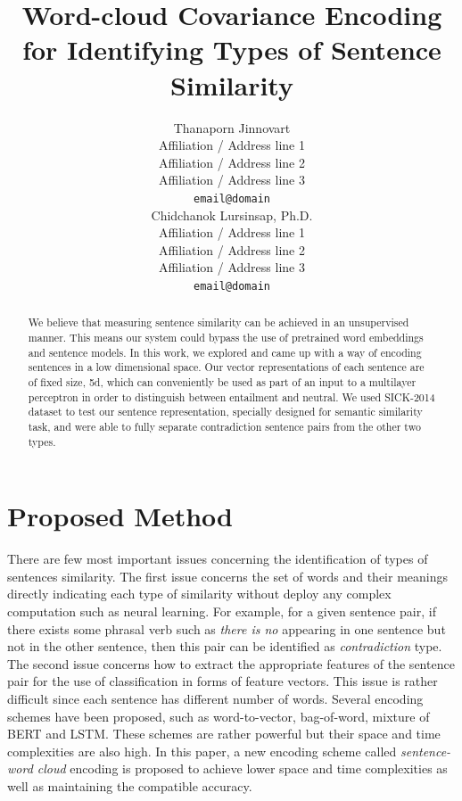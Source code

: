 \documentclass[11pt]{article}
\title{Word-cloud Covariance Encoding for Identifying Types of Sentence Similarity}
\author{Thanaporn Jinnovart \\
  Affiliation / Address line 1 \\
  Affiliation / Address line 2 \\
  Affiliation / Address line 3 \\
  \texttt{email@domain} \\\And
  Chidchanok Lursinsap, Ph.D. \\
  Affiliation / Address line 1 \\
  Affiliation / Address line 2 \\
  Affiliation / Address line 3 \\
  \texttt{email@domain} \\}
\begin{document}
\maketitle
\begin{abstract}
We believe that measuring sentence similarity can be achieved in an unsupervised manner. This means our system could bypass the use of pretrained word embeddings and sentence models. In this work, we explored and came up with a way of encoding sentences in a low dimensional space. Our vector representations of each sentence are of fixed size, 5d, which can conveniently be used as part of an input to a multilayer perceptron in order to distinguish between entailment and neutral. We used SICK-2014 dataset to test our sentence representation, specially designed for semantic similarity task, and were able to fully separate contradiction sentence pairs from the other two types. 
\end{abstract}


\section{Proposed Method}

There are few most important issues concerning the identification of types of sentences similarity. The first
issue concerns the set of words and their meanings directly indicating each type of similarity without
deploy any complex computation such as neural learning. 
For example, for a given sentence pair, if there exists some phrasal verb such as {\em there is no} 
appearing in one sentence but not in the other sentence, then this pair can be identified as {\em 
contradiction} type. The second issue concerns how to extract the appropriate features of the sentence pair
for the use of classification in forms of feature vectors. This issue is rather difficult since each 
sentence has different number of words. Several encoding schemes have been proposed, such as word-to-vector,
bag-of-word, mixture of BERT and LSTM. These schemes are rather powerful but their space and time
complexities are also high. In this paper, a new encoding scheme called {\em sentence-word cloud} encoding
is proposed to achieve lower space and time complexities as well as maintaining the compatible accuracy.
\end{document}
